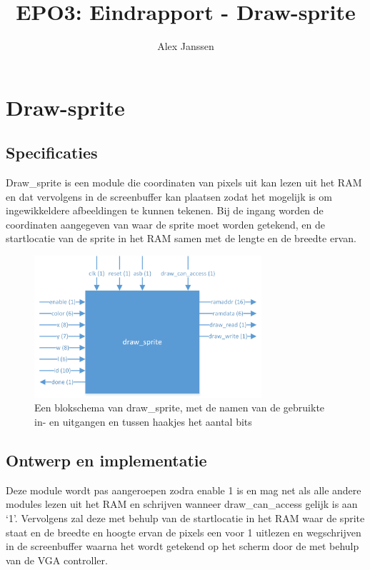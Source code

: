 \documentclass{scrartcl} %
\author{Alex Janssen}
\title{EPO3: Eindrapport - Draw-sprite}
\begin{document}
\section{Draw-sprite}
\label{sec:draw-sprite}

\subsection{Specificaties}
Draw\_sprite is een module die coordinaten van pixels uit kan lezen uit het RAM en dat vervolgens in de screenbuffer kan plaatsen zodat het mogelijk is om ingewikkeldere afbeeldingen te kunnen tekenen. Bij de ingang worden de coordinaten aangegeven van waar de sprite moet worden getekend, en de startlocatie van de sprite in het RAM samen met de lengte en de breedte ervan.

\begin{figure}[H]
	\centering
	\includegraphics[width=0.75\textwidth]{resource/draw_sprite.png}
	\caption{Een blokschema van draw\_sprite, met de namen van de gebruikte in- en uitgangen en tussen haakjes het aantal bits}
	\label{fig:draw-sprite-schema}
\end{figure}

\subsection{Ontwerp en implementatie}
Deze module wordt pas aangeroepen zodra enable 1 is en mag net als alle andere modules lezen uit het RAM en schrijven wanneer draw\_can\_access gelijk is aan `1'. Vervolgens zal deze met behulp van de startlocatie in het RAM waar de sprite staat en de breedte en hoogte ervan de pixels een voor 1 uitlezen en wegschrijven in de screenbuffer waarna het wordt getekend op het scherm door de met behulp van de VGA controller.

\end{document}
